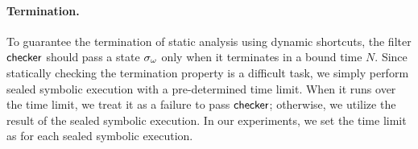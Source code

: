 \paragraph{Termination.}
To guarantee the termination of static analysis using dynamic shortcuts, the
filter $\textsf{checker}$ should pass a state ${\sigma}_\omega$ only when it terminates in a
bound time $N$.  Since statically checking the termination property is a difficult task,
we simply perform sealed symbolic execution with a pre-determined time limit.  When it runs
over the time limit, we treat it as a failure to pass $\textsf{checker}$; otherwise, we utilize
the result of the sealed symbolic execution.  In our experiments, we set the time limit as
 for each sealed symbolic execution.






